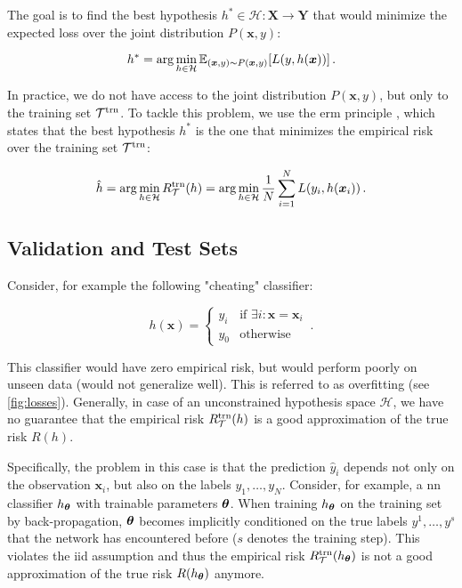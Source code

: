 The goal is to find the best hypothesis $h^* \in \mathcal{H}:
    \mathbf{X} \rightarrow \mathbf{Y}$ that would minimize the expected loss over the joint distribution $P(\bm{x}, y)$:

\begin{equation}
    h^* = \arg \min_{h \in \mathcal{H}} \mathbb{E}_{(\bm{x}, y) \sim P(\bm{x}, y)}[L(y, h(\bm{x}))]\,.
\end{equation}

In practice, we do not have access to the joint distribution $P(\bm{x}, y)$, but only to the training set $\mathcal{T}^\text{trn}$. To
tackle this problem, we use the \gls{erm} principle \cite{risk-minimization}, which states that the best hypothesis
$h^*$ is the one that minimizes the empirical risk over the training set $\mathcal{T}^\text{trn}$:

\begin{equation}
    \hat{h} = \arg \min_{h \in \mathcal{H}} R_\mathcal{T}^\text{trn}(h) = \arg \min_{h \in \mathcal{H}} \frac{1}{N} \sum_{i=1}^{N} L(y_i, h(\bm{x}_i))\,.
\end{equation}










\subsection{Validation and Test Sets}

Consider, for example the following "cheating" classifier:

\begin{equation}
    h(\bm{x}) = \begin{cases}
        y_i & \text{if } \exists i : \bm{x} = \bm{x}_i \\
        y_0 & \text{otherwise}
    \end{cases}\,.
\end{equation}


This classifier would have zero empirical risk, but would perform poorly on unseen data (would not generalize well).
This is referred to as overfitting (see \autoref{fig:losses}). Generally, in case of an unconstrained
hypothesis space $\mathcal{H}$, we have no guarantee that the empirical risk $R_\mathcal{T}^\text{trn}(h)$ is a good approximation of the
true risk $R(h)$.


Specifically, the problem in this case is that the prediction $\hat{y}_i$ depends not only on the observation
$\bm{x}_i$, but also on the labels $y_1, \dots, y_N$. Consider, for example, a \gls{nn} classifier $h_{{\boldsymbol{\theta}}}$ with trainable
parameters ${\boldsymbol{\theta}}$. When training $h_{{\boldsymbol{\theta}}}$ on the training set by back-propagation, ${\boldsymbol{\theta}}$  becomes implicitly
conditioned on the true labels $y^1, \dots, y^s$ that the network has encountered before ($s$ denotes the training step).
This violates the \gls{iid} assumption and thus the empirical risk $R_\mathcal{T}^\text{trn}(h_{{\boldsymbol{\theta}}})$ is not a good approximation of
the true risk $R(h_{{\boldsymbol{\theta}}})$ anymore.


